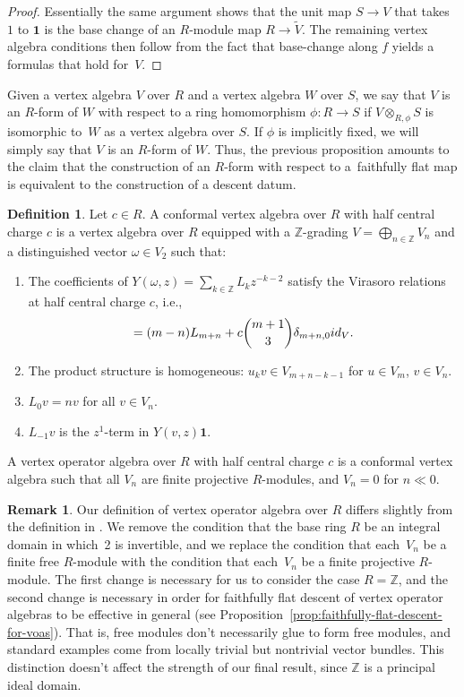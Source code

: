 \documentclass[11pt]{article}
\newcommand{\bZ}{\mathbb{Z}}
\newcommand{\unit}{\mathbf{1}}
\theoremstyle{definition}
\newtheorem{defn}[thm]{Definition}
\newtheorem{rem}[thm]{Remark}
\begin{document}
\begin{proof}
Essentially the same argument shows that the unit map $S \to V$ that takes~$1$ to $\unit$ is the base change of an $R$-module map $R \to \tilde{V}$. The remaining vertex algebra conditions then follow from the fact that base-change along $f$ yields a formulas that hold for~$V$.
\end{proof}

Given a vertex algebra $V$ over $R$ and a vertex algebra $W$ over $S$, we say that $V$ is an $R$-form of $W$ with respect to a ring homomorphism $\phi\colon R \to S$ if $V \otimes_{R,\phi} S$ is isomorphic to~$W$ as a vertex algebra over $S$. If $\phi$ is implicitly fixed, we will simply say that $V$ is an $R$-form of $W$. Thus, the previous proposition amounts to the claim that the construction of an $R$-form with respect to a~faithfully flat map is equivalent to the construction of a descent datum.

\begin{defn}
Let $c\in R$. A conformal vertex algebra over $R$ with half central charge $c$ is a vertex algebra over $R$ equipped with a $\bZ$-grading $V = \bigoplus_{n \in \bZ} V_n$ and a distinguished vector $\omega \in V_2$ such that:
\begin{enumerate}\itemsep=0pt
\item The coefficients of $Y(\omega,z) = \sum\limits_{k \in \bZ} L_k z^{-k-2}$ satisfy the Virasoro relations at half central charge $c$, i.e.,
\begin{gather*} [L_m, L_n] = (m-n)L_{m+n} + c \binom{m+1}{3} \delta_{m+n,0} {\rm id}_V. \end{gather*}
\item The product structure is homogeneous: $u_k v \in V_{m+n-k-1}$ for $u \in V_m$, $v \in V_n$.
\item $L_0 v = nv$ for all $v \in V_n$.
\item $L_{-1}v$ is the $z^1$-term in $Y(v,z)\unit$.
\end{enumerate}
A vertex operator algebra over $R$ with half central charge $c$ is a conformal vertex algebra such that all $V_n$ are finite projective $R$-modules, and $V_n = 0$ for $n \ll 0$.
\end{defn}

\begin{rem}Our definition of vertex operator algebra over $R$ differs slightly from the defi\-nition in \cite{DR13}. We remove the condition that the base ring $R$ be an integral domain in which~2 is invertible, and we replace the condition that each~$V_n$ be a finite free $R$-module with the condition that each~$V_n$ be a finite projective $R$-module. The first change is necessary for us to consider the case $R = \bZ$, and the second change is necessary in order for faithfully flat descent of vertex operator algebras to be effective in general (see Proposition~\ref{prop:faithfully-flat-descent-for-voas}). That is, free modules don't necessarily glue to form free modules, and standard examples come from locally trivial but nontrivial vector bundles. This distinction doesn't affect the strength of our final result, since $\bZ$ is a principal ideal domain.
\end{rem}
\end{document}

